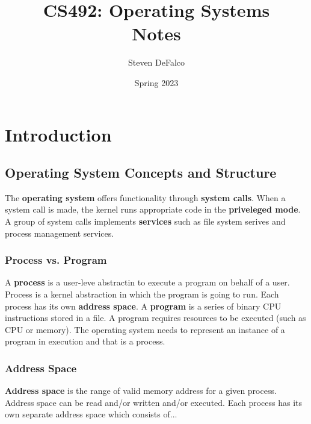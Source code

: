 \documentclass{article}
\title{CS492: Operating Systems \\ Notes}
\author{Steven DeFalco}
\date{Spring 2023}
\begin{document}
\renewcommand{\i}{\item}
\newcommand{\bl}{\begin{itemize}}
\newcommand{\el}{\end{itemize}}
\renewcommand{\b}[1]{\textbf{#1}}

\maketitle

\tableofcontents

\newpage

\section{Introduction}

\subsection{Operating System Concepts and Structure}

    The \textbf{operating system} offers functionality through \textbf{system calls}. When a system call is made, the kernel runs appropriate code in the \textbf{priveleged mode}. \\

    \noindent A group of system calls implements \textbf{services} such as file system serives and process management services. \\

    \subsubsection{Process vs. Program}

    \noindent A \textbf{process} is a user-leve abstractin to execute a program on behalf of a user. Process is a kernel abstraction in which the program is going to run. Each process has its own \textbf{address space}. A \textbf{program} is a series of binary CPU instructions stored in a file. A program requires resources to be executed (such as CPU or memory). The operating system needs to represent an instance of a program in execution and that is a process. 

    \subsubsection{Address Space}

    \noindent \textbf{Address space} is the range of valid memory address for a given process. Address space can be read and/or written and/or executed. Each process has its own separate address space which consists of...
    
\end{document}
